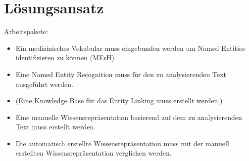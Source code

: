 \chapter{Lösungsansatz}

Arbeitspakete:
\begin{itemize}
    \item Ein medizinisches Vokabular muss eingebunden werden um Named Entities identifizieren zu können (MEsH).
    \item Eine Named Entity Recognition muss für den zu analysierenden Text ausgeführt werden.
    \item (Eine Knowledge Base für das Entity Linking muss erstellt werden.) 
    \item Eine manuelle Wissensrepräsentation basierend auf dem zu analysierenden Text muss erstellt werden.
    \item Die automatisch erstellte Wissensrepräsentation muss mit der manuell erstellten Wissensrepräsentation verglichen werden.
\end{itemize}

\lipsum[1-2]